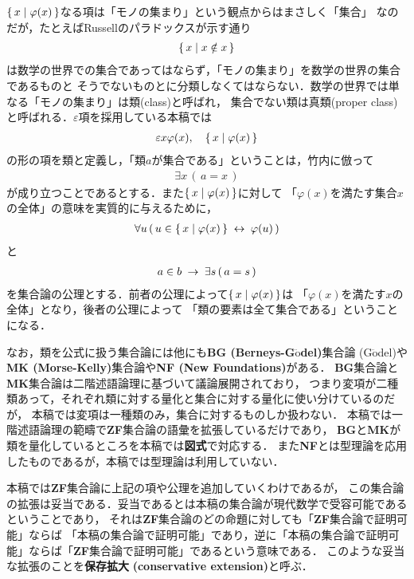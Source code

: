 	$\{\, x \mid \varphi(x)\, \}$なる項は「モノの集まり」という観点からはまさしく「集合」
	なのだが，たとえばRussellのパラドックスが示す通り
	\begin{align}
		\{\, x \mid x \notin x\, \}
	\end{align}
	は数学の世界での集合であってはならず，「モノの集まり」を数学の世界の集合であるものと
	そうでないものとに分類しなくてはならない．数学の世界では単なる「モノの集まり」は類(class)と呼ばれ，
	集合でない類は真類(proper class)と呼ばれる．$\varepsilon$項を採用している本稿では
	\begin{align}
		\varepsilon x \varphi(x),\quad \{\, x \mid \varphi(x)\, \}
	\end{align}
	の形の項を類と定義し，「類$a$が集合である」ということは，竹内\cite{TakeuchiSet}に倣って
	\begin{align}
		\exists x\, (\, a = x\, )
	\end{align}
	が成り立つことであるとする．また$\{\, x \mid \varphi(x)\, \}$に対して
	「$\varphi(x)$を満たす集合$x$の全体」の意味を実質的に与えるために，
	\begin{align}
		\forall u\, (\, u \in \{\, x \mid \varphi(x)\, \} \hspace{0.25em}\leftrightarrow\hspace{0.25em} \varphi(u)\, )
	\end{align}
	と
	\begin{align}
		a \in b \hspace{0.25em}\rightarrow\hspace{0.25em} \exists s\, (\, a = s\, )
	\end{align}
	を集合論の公理とする．前者の公理によって$\{\, x \mid \varphi(x)\, \}$は
	「$\varphi(x)$を満たす$x$の全体」となり，後者の公理によって
	「類の要素は全て集合である」ということになる．
	
	なお，類を公式に扱う集合論には他にも{\bf BG (Berneys-G$\ddot{\mbox{o}}$del)}集合論
	(G$\ddot{\mbox{o}}$del\cite{Godel})や
	{\bf MK (Morse-Kelly)}集合論や{\bf NF (New Foundations)}がある．
	{\bf BG}集合論と{\bf MK}集合論は二階述語論理に基づいて議論展開されており，
	つまり変項が二種類あって，それぞれ類に対する量化と集合に対する量化に使い分けているのだが，
	本稿では変項は一種類のみ，集合に対するものしか扱わない．
	本稿では一階述語論理の範疇で{\bf ZF}集合論の語彙を拡張しているだけであり，
	{\bf BG}と{\bf MK}が類を量化しているところを本稿では{\bf 図式}で対応する．
	また{\bf NF}とは型理論を応用したものであるが，本稿では型理論は利用していない．
	
	本稿では{\bf ZF}集合論に上記の項や公理を追加していくわけであるが，
	この集合論の拡張は妥当である．妥当であるとは本稿の集合論が現代数学で受容可能であるということであり，
	それは{\bf ZF}集合論のどの命題に対しても「{\bf ZF}集合論で証明可能」ならば
	「本稿の集合論で証明可能」であり，逆に「本稿の集合論で証明可能」ならば「{\bf ZF}集合論で証明可能」であるという意味である．
	このような妥当な拡張のことを{\bf 保存拡大}
	{\bf (conservative extension)}と呼ぶ．
	
